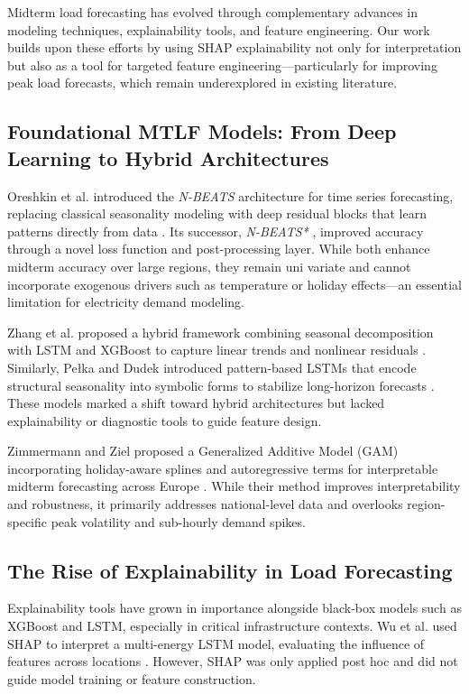 \documentclass[final,numbered]{ifacconf}
\begin{document}
Midterm load forecasting has evolved through complementary advances in modeling techniques, explainability tools, and feature engineering. Our work builds upon these efforts by using SHAP explainability not only for interpretation but also as a tool for targeted feature engineering—particularly for improving peak load forecasts, which remain underexplored in existing literature.

\subsection{Foundational MTLF Models: From Deep Learning to Hybrid Architectures}

Oreshkin et al. introduced the \textit{N-BEATS} architecture for time series forecasting, replacing classical seasonality modeling with deep residual blocks that learn patterns directly from data \cite{Oreshkin2020NBEATSNN}. Its successor, \textit{N-BEATS*} \cite{Kasprzyk2024EnhancedNF}, improved accuracy through a novel loss function and post-processing layer. While both enhance midterm accuracy over large regions, they remain uni variate and cannot incorporate exogenous drivers such as temperature or holiday effects—an essential limitation for electricity demand modeling.

Zhang et al. proposed a hybrid framework combining seasonal decomposition with LSTM and XGBoost to capture linear trends and nonlinear residuals \cite{Kasprzyk2024EnhancedNF}. Similarly, Pełka and Dudek introduced pattern-based LSTMs that encode structural seasonality into symbolic forms to stabilize long-horizon forecasts \cite{Peka2020PatternbasedLS}. These models marked a shift toward hybrid architectures but lacked explainability or diagnostic tools to guide feature design.

Zimmermann and Ziel proposed a Generalized Additive Model (GAM) incorporating holiday-aware splines and autoregressive terms for interpretable midterm forecasting across Europe \cite{Zimmermann2024EfficientMF}. While their method improves interpretability and robustness, it primarily addresses national-level data and overlooks region-specific peak volatility and sub-hourly demand spikes.

\subsection{The Rise of Explainability in Load Forecasting}

Explainability tools have grown in importance alongside black-box models such as XGBoost and LSTM, especially in critical infrastructure contexts. Wu et al. used SHAP to interpret a multi-energy LSTM model, evaluating the influence of features across locations \cite{Wu2022AnEF}. However, SHAP was only applied post hoc and did not guide model training or feature construction.
\end{document}
